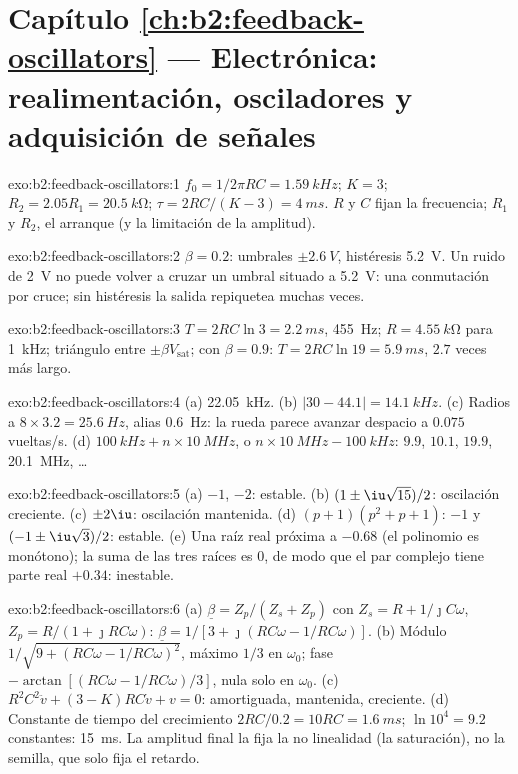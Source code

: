 \section*{Capítulo \ref{ch:b2:feedback-oscillators} --- Electrónica: realimentación, osciladores y adquisición de señales}

\begin{solution}{exo:b2:feedback-oscillators:1}
$f_0 = 1/2\pi RC = \qty{1.59}{kHz}$; $K = 3$; $R_2 = 2.05R_1 = \qty{20.5}{k\ohm}$;
$\tau = 2RC/(K - 3) = \qty{4}{ms}$. $R$ y $C$ fijan la frecuencia; $R_1$ y $R_2$, el
arranque (y la limitación de la amplitud).
\end{solution}

\begin{solution}{exo:b2:feedback-oscillators:2}
$\beta = 0.2$: umbrales $\pm\qty{2.6}{V}$, histéresis \qty{5.2}{V}. Un ruido de
\qty{2}{V} no puede volver a cruzar un umbral situado a \qty{5.2}{V}: una
conmutación por cruce; sin histéresis la salida repiquetea muchas veces.
\end{solution}

\begin{solution}{exo:b2:feedback-oscillators:3}
$T = 2RC\ln3 = \qty{2.2}{ms}$, \qty{455}{Hz}; $R = \qty{4.55}{k\ohm}$ para \qty{1}{kHz};
triángulo entre $\pm\beta V_{\text{sat}}$; con $\beta = 0.9$: $T = 2RC\ln19 = \qty{5.9}{ms}$,
$2.7$ veces más largo.
\end{solution}

\begin{solution}{exo:b2:feedback-oscillators:4}
(a) \qty{22.05}{kHz}. (b) $|30 - 44.1| = \qty{14.1}{kHz}$. (c) Radios a $8 \times 3.2 =
\qty{25.6}{Hz}$, alias \qty{0.6}{Hz}: la rueda parece avanzar despacio a
$0.075$ vueltas/s. (d) $\qty{100}{kHz} + n \times \qty{10}{MHz}$, o $n \times \qty{10}{MHz} -
\qty{100}{kHz}$: $9.9$, $10.1$, $19.9$, \qty{20.1}{MHz}, \dots
\end{solution}

\begin{solution}{exo:b2:feedback-oscillators:5}
(a) $-1$, $-2$: estable. (b) $(1 \pm \iu\sqrt{15})/2$: oscilación creciente.
(c) $\pm2\iu$: oscilación mantenida. (d) $(p + 1)(p^2 + p + 1)$: $-1$ y
$(-1 \pm \iu\sqrt3)/2$: estable. (e) Una raíz real próxima a $-0.68$ (el
polinomio es monótono); la suma de las tres raíces es $0$, de modo que el
par complejo tiene parte real $+0.34$: inestable.
\end{solution}

\begin{solution}{exo:b2:feedback-oscillators:6}
(a) $\underline\beta = Z_p/(Z_s + Z_p)$ con $Z_s = R + 1/\jmath C\omega$, $Z_p = R/(1 +
\jmath RC\omega)$: $\underline\beta = 1/[3 + \jmath(RC\omega - 1/RC\omega)]$. (b) Módulo
$1/\sqrt{9 + (RC\omega - 1/RC\omega)^2}$, máximo $1/3$ en $\omega_0$; fase $-\arctan
[(RC\omega - 1/RC\omega)/3]$, nula solo en $\omega_0$. (c) $R^2C^2\ddot v + (3 - K)RC
\dot v + v = 0$: amortiguada, mantenida, creciente. (d) Constante de tiempo
del crecimiento $2RC/0.2 = 10RC = \qty{1.6}{ms}$; $\ln10^4 = 9.2$ constantes: \qty{15}{ms}. La
amplitud final la fija la no linealidad (la saturación), no la semilla,
que solo fija el retardo.
\end{solution}

